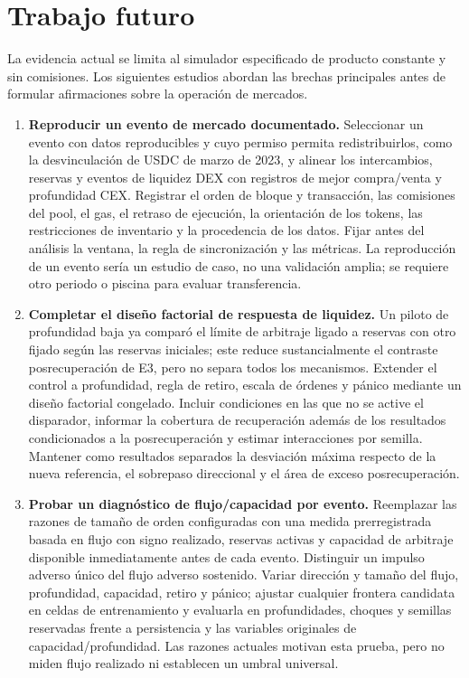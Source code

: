 \chapter{Trabajo futuro}
\label{cap:futuro}

La evidencia actual se limita al simulador especificado de producto constante y sin comisiones. Los siguientes estudios abordan las brechas principales antes de formular afirmaciones sobre la operación de mercados.

\begin{enumerate}
  \item \textbf{Reproducir un evento de mercado documentado.} Seleccionar un evento con datos reproducibles y cuyo permiso permita redistribuirlos, como la desvinculación de USDC de marzo de 2023, y alinear los intercambios, reservas y eventos de liquidez DEX con registros de mejor compra/venta y profundidad CEX. Registrar el orden de bloque y transacción, las comisiones del pool, el gas, el retraso de ejecución, la orientación de los tokens, las restricciones de inventario y la procedencia de los datos. Fijar antes del análisis la ventana, la regla de sincronización y las métricas. La reproducción de un evento sería un estudio de caso, no una validación amplia; se requiere otro periodo o piscina para evaluar transferencia.
  \item \textbf{Completar el diseño factorial de respuesta de liquidez.} Un piloto de profundidad baja ya comparó el límite de arbitraje ligado a reservas con otro fijado según las reservas iniciales; este reduce sustancialmente el contraste posrecuperación de E3, pero no separa todos los mecanismos. Extender el control a profundidad, regla de retiro, escala de órdenes y pánico mediante un diseño factorial congelado. Incluir condiciones en las que no se active el disparador, informar la cobertura de recuperación además de los resultados condicionados a la posrecuperación y estimar interacciones por semilla. Mantener como resultados separados la desviación máxima respecto de la nueva referencia, el sobrepaso direccional y el área de exceso posrecuperación.
  \item \textbf{Probar un diagnóstico de flujo/capacidad por evento.} Reemplazar las razones de tamaño de orden configuradas con una medida prerregistrada basada en flujo con signo realizado, reservas activas y capacidad de arbitraje disponible inmediatamente antes de cada evento. Distinguir un impulso adverso único del flujo adverso sostenido. Variar dirección y tamaño del flujo, profundidad, capacidad, retiro y pánico; ajustar cualquier frontera candidata en celdas de entrenamiento y evaluarla en profundidades, choques y semillas reservadas frente a persistencia y las variables originales de capacidad/profundidad. Las razones actuales motivan esta prueba, pero no miden flujo realizado ni establecen un umbral universal.

\end{enumerate}

